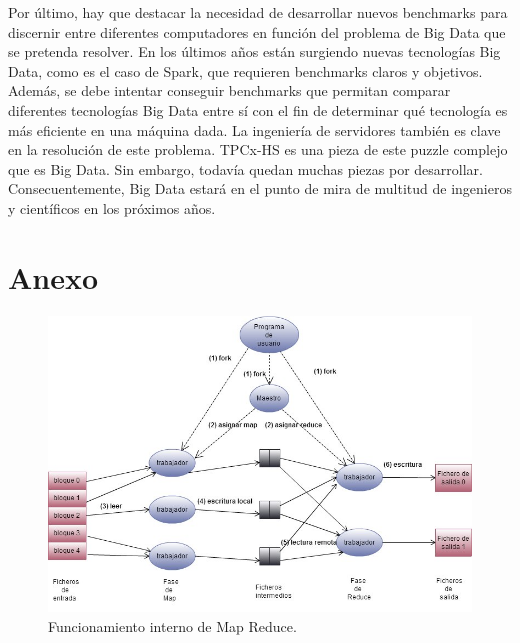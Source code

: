 \documentclass[10pt]{article}
\begin{document}
	Por último, hay que destacar la necesidad de desarrollar nuevos benchmarks para discernir entre diferentes computadores en función del problema de Big Data que se pretenda resolver. En los últimos años están surgiendo nuevas tecnologías Big Data, como es el caso de Spark, que requieren benchmarks claros y objetivos. Además, se debe intentar conseguir benchmarks que permitan comparar diferentes tecnologías Big Data entre sí con el fin de determinar qué tecnología es más eficiente en una máquina dada. La ingeniería de servidores también es clave en la resolución de este problema. TPCx-HS es una pieza de este puzzle complejo que es Big Data. Sin embargo, todavía quedan muchas piezas por desarrollar. Consecuentemente, Big Data estará en el punto de mira de multitud de ingenieros y científicos en los próximos años.
	



\fontsize{5}{7}\selectfont

\printbibliography


\section*{Anexo}

	\begin{figure}[H]
		\centering
		\includegraphics[width=14cm]{./images/MapReduce-MasterWorkers.jpg}
		\caption{Funcionamiento interno de Map Reduce.} 
		\label{fig:map-reduce:master-workers}
	\end{figure}
\end{document}

